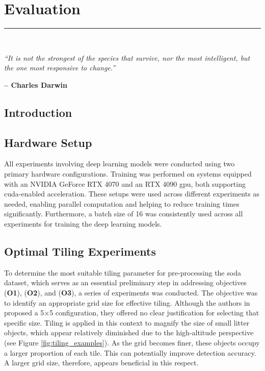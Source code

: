 \graphicspath{{content/chapters/5_evaluation/figures/}}

\chapter{Evaluation}%
\label{chp:evaluation}
\rule{\textwidth}{1pt} \\[1ex]

\epigraph{\textit{``It is not the strongest of the species that survive, nor the most intelligent, but the one most responsive to change.''}}{\textbf{-- Charles Darwin}}

\section{Introduction}
\label{sec:5_introduction}

\section{Hardware Setup}
\label{sec:5_hardware_setup}

All experiments involving deep learning models were conducted using two primary hardware configurations. Training was performed on systems equipped with an NVIDIA GeForce RTX 4070 and an RTX 4090 \gls{gpu}, both supporting \gls{cuda}-enabled acceleration. These setups were used across different experiments as needed, enabling parallel computation and helping to reduce training times significantly. Furthermore, a batch size of 16 was consistently used across all experiments for training the deep learning models.


\section{Optimal Tiling Experiments}
\label{sec:5_tiling_exp}

To determine the most suitable tiling parameter for pre-processing the \gls{soda} dataset, which serves as an essential preliminary step in addressing objectives (\textbf{O1}), (\textbf{O2}), and (\textbf{O3}), a series of experiments was conducted. The objective was to identify an appropriate grid size for effective tiling. Although the authors in \cite{detect_litter} proposed a 5$\times$5 configuration, they offered no clear justification for selecting that specific size.
Tiling is applied in this context to magnify the size of small litter objects, which appear relatively diminished due to the high-altitude perspective (see Figure \ref{fig:tiling_examples}). As the grid becomes finer, these objects occupy a larger proportion of each tile. This can potentially improve detection accuracy. A larger grid size, therefore, appears beneficial in this respect.

